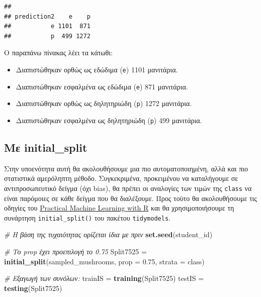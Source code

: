 \documentclass[
]{article}
\newenvironment{Shaded}{\begin{snugshade}}{\end{snugshade}}
\newcommand{\AttributeTok}[1]{\textcolor[rgb]{0.13,0.29,0.53}{#1}}
\newcommand{\CommentTok}[1]{\textcolor[rgb]{0.56,0.35,0.01}{\textit{#1}}}
\newcommand{\FloatTok}[1]{\textcolor[rgb]{0.00,0.00,0.81}{#1}}
\newcommand{\FunctionTok}[1]{\textcolor[rgb]{0.13,0.29,0.53}{\textbf{#1}}}
\newcommand{\NormalTok}[1]{#1}
\newcommand{\OtherTok}[1]{\textcolor[rgb]{0.56,0.35,0.01}{#1}}
\begin{document}
\begin{verbatim}
##            
## prediction2    e    p
##           e 1101  871
##           p  499 1272
\end{verbatim}

Ο παραπάνω πίνακας λέει τα κάτωθι:

\begin{itemize}
\item
  Διαπιστώθηκαν ορθώς ως εδώδιμα (\texttt{e}) 1101 μανιτάρια.
\item
  Διαπιστώθηκαν εσφαλμένα ως εδώδιμα (\texttt{e}) 871 μανιτάρια.
\item
  Διαπιστώθηκαν ορθώς ως δηλητηριώδη (\texttt{p}) 1272 μανιτάρια.
\item
  Διαπιστώθηκαν εσφαλμένα ως δηλητηριώδη (\texttt{p}) 499 μανιτάρια.
\end{itemize}

\subsection{Με initial\_split}\label{ux3bcux3b5-initial_split}

Στην υποενότητα αυτή θα ακολουθήσουμε μια πιο αυτοματοποιημένη, αλλά και
πιο στατιστικά αμερόληπτη μέθοδο. Συγκεκριμένα, προκειμένου να
καταλήγουμε σε αντιπροσωπευτικό δείγμα (όχι bias), θα πρέπει οι
αναλογίες των τιμών της \texttt{class} να είναι παρόμοιες σε κάθε δείγμα
που θα διαλέξουμε. Προς τούτο θα ακολουθήσουμε τις οδηγίες του
\href{https://www.routledge.com/Practical-Machine-Learning-with-R-Tutorials-and-Case-Studies/Lange/p/book/9781032434056}{Practical
Machine Learning with R} και θα χρησιμοποιήσουμε τη συνάρτηση
\texttt{initial\_split()} του πακέτου \texttt{tidymodels}.

\begin{Shaded}
\begin{Highlighting}[]
\CommentTok{\# Η βάση της τυχαιότητας ορίζεται ίδια με πριν}
\FunctionTok{set.seed}\NormalTok{(student\_id)}

\CommentTok{\# Το prop έχει προεπιλογή το 0.75}
\NormalTok{Split7525 }\OtherTok{=} \FunctionTok{initial\_split}\NormalTok{(sampled\_mushrooms, }\AttributeTok{prop =} \FloatTok{0.75}\NormalTok{, }\AttributeTok{strata =}\NormalTok{ class)}

\CommentTok{\# Εξαγωγή των συνόλων:}
\NormalTok{trainIS }\OtherTok{=} \FunctionTok{training}\NormalTok{(Split7525)}
\NormalTok{testIS  }\OtherTok{=} \FunctionTok{testing}\NormalTok{(Split7525)}
\end{Highlighting}
\end{Shaded}
\end{document}
